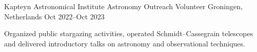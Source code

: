 

\begin{cventries}
    \cventry
    {Kapteyn Astronomical Institute} %
    {Astronomy Outreach Volunteer} %
    {Groningen, Netherlands} %
    {Oct 2022--Oct 2023} %
    {
        \begin{cvitems} %
            \item {Organized public stargazing activities, operated Schmidt--Cassegrain telescopes and delivered introductory talks on astronomy and observational techniques.}
        \end{cvitems}
    }

\end{cventries}
